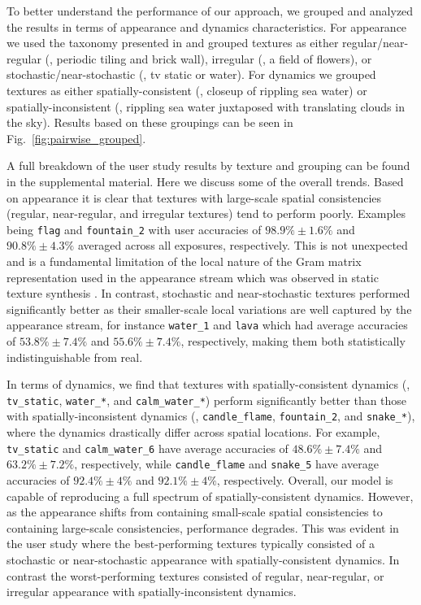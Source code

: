 To better understand the performance of our approach,
we grouped and analyzed the results in terms of
appearance and dynamics characteristics.
For appearance we used the taxonomy
presented in \cite{lin2006quantitative} and grouped textures as
either regular/near-regular (\eg, periodic tiling and brick wall), 
irregular (\eg, a field of flowers), or
stochastic/near-stochastic (\eg, tv static or water).
For dynamics we grouped textures as either 
spatially-consistent (\eg, closeup of rippling sea water) or 
spatially-inconsistent (\eg, rippling sea water juxtaposed 
with translating clouds in the sky).
Results based on these groupings can be seen in
Fig.\ \ref{fig:pairwise_grouped}.



A full breakdown of the user study results by texture and 
grouping can be found in the supplemental material.
Here we discuss some of the overall trends.
Based on appearance it is clear that textures with
large-scale  spatial consistencies (regular, near-regular, 
and irregular textures) tend to perform poorly.
Examples being \texttt{flag} and \texttt{fountain\_2} with
user accuracies of $98.9\% \pm 1.6\%$ and $90.8\% \pm 4.3\%$ 
averaged across all exposures, respectively.
This is not unexpected and is a fundamental limitation of the 
local nature of the Gram matrix representation used in the 
appearance stream which was observed in static texture synthesis 
\cite{gatys2015}.
In contrast, stochastic and near-stochastic textures 
performed significantly better as their smaller-scale local 
variations are well captured by the appearance stream, for 
instance \texttt{water\_1} and \texttt{lava} which had 
average accuracies of $53.8\% \pm 7.4\%$ and
$55.6\% \pm 7.4\%$, respectively, making them both 
statistically indistinguishable from real.



In terms of dynamics, we find that textures with
spatially-consistent dynamics (\eg, \texttt{tv\_static}, 
\texttt{water\_*}, and  \texttt{calm\_water\_*}) perform 
significantly better than those with spatially-inconsistent 
dynamics (\eg, \texttt{candle\_flame}, \texttt{fountain\_2}, 
and \texttt{snake\_*}), where the dynamics drastically differ 
across spatial locations.
For example, \texttt{tv\_static} and \texttt{calm\_water\_6}
have average accuracies of $48.6\% \pm 7.4\%$ and
$63.2\% \pm 7.2\%$, respectively, while
\texttt{candle\_flame} and \texttt{snake\_5} have average 
accuracies of $92.4\% \pm 4\%$ and $92.1\% \pm 4\%$, 
respectively.
Overall, our model is capable of reproducing a full spectrum
of spatially-consistent dynamics.
However, as the appearance shifts from containing small-scale 
spatial consistencies to containing large-scale consistencies,
performance degrades.
This was evident in the user study where the best-performing 
textures typically consisted of a stochastic or
near-stochastic appearance with spatially-consistent 
dynamics.
In contrast the worst-performing textures consisted of
regular, near-regular, or irregular appearance with
spatially-inconsistent dynamics.